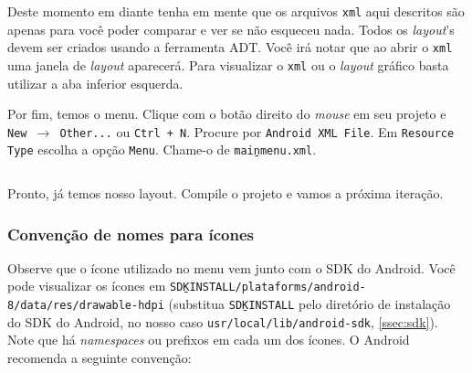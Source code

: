 \begin{listing}[H]
  \inputminted[linenos=true,frame=bottomline,tabsize=3]{ xml }{ source/main-1.xml }
  \caption{Layout principal [res/layout/main.xml]}
\end{listing}

Deste momento em diante tenha em mente que os arquivos \texttt{\gls{xml}} aqui descritos são apenas para
você poder comparar e ver se não esqueceu nada. Todos os \textit{layout}'s devem ser criados usando a
ferramenta ADT. Você irá notar que ao abrir o \texttt{xml} uma janela de \textit{layout} aparecerá.
Para visualizar o \texttt{xml} ou o \textit{layout} gráfico basta utilizar a aba inferior esquerda.

Por fim, temos o menu. Clique com o botão direito do \textit{mouse} em seu projeto e \texttt{New
$\rightarrow$ Other...} ou \texttt{Ctrl + N}. Procure por \texttt{Android XML File}. Em \texttt{Resource
Type} escolha a opção \texttt{Menu}. Chame-o de \texttt{main\b{ }menu.xml}.

\begin{listing}[H]
  \inputminted[linenos=true,frame=bottomline,tabsize=3]{ xml }{ source/main_menu-1.xml }
  \caption{Menu principal [res/menu/main\b{ }menu.xml]}
\end{listing}

Pronto, já temos nosso layout. Compile o projeto e vamos a próxima iteração.

\subsubsection{Convenção de nomes para ícones\label{sssec:nomeicones}}

Observe que o ícone utilizado no menu vem junto com o SDK do Android. Você pode visualizar os
ícones em \texttt{SDK\b{ }INSTALL/plataforms/android-8/data/res/drawable-hdpi}
(substitua \texttt{SDK\b{ }INSTALL} pelo diretório de instalação do SDK do Android, no nosso caso
\texttt{usr/local/lib/android-sdk}, \ref{ssec:sdk}). Note que há \textit{namespaces} ou prefixos em
cada um dos ícones. O Android recomenda a seguinte convenção:

